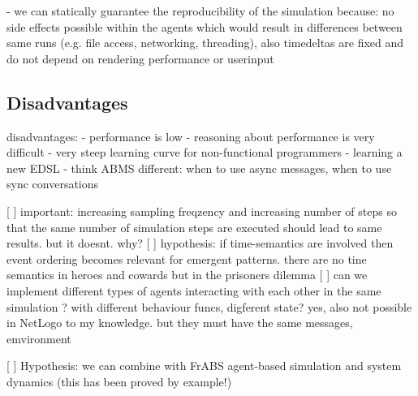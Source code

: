 	- we can statically guarantee the reproducibility of the simulation because: no side effects possible within the agents which would result in differences between same runs (e.g. file access, networking, threading), also timedeltas are fixed and do not depend on rendering performance or userinput	
	
\subsection{Disadvantages}
disadvantages:
	- performance is low
	- reasoning about performance is very difficult
	- very steep learning curve for non-functional programmers
	- learning a new EDSL
	- think ABMS different: when to use async messages, when to use sync conversations


[ ] important: increasing sampling freqzency and increasing number of steps so that the same number of simulation steps are executed should lead to same results. but it doesnt. why?
[ ] hypothesis: if time-semantics are involved then event ordering becomes relevant for emergent patterns. there are no tine semantics in heroes and cowards but in the prisoners dilemma
[ ] can we implement different types of agents interacting with each other in the same simulation ? with different behaviour funcs, digferent state? yes, also not possible in NetLogo to my knowledge. but they must have the same messages, emvironment 

[ ] Hypothesis: we can combine with FrABS agent-based simulation and system dynamics (this has been proved by example!)
